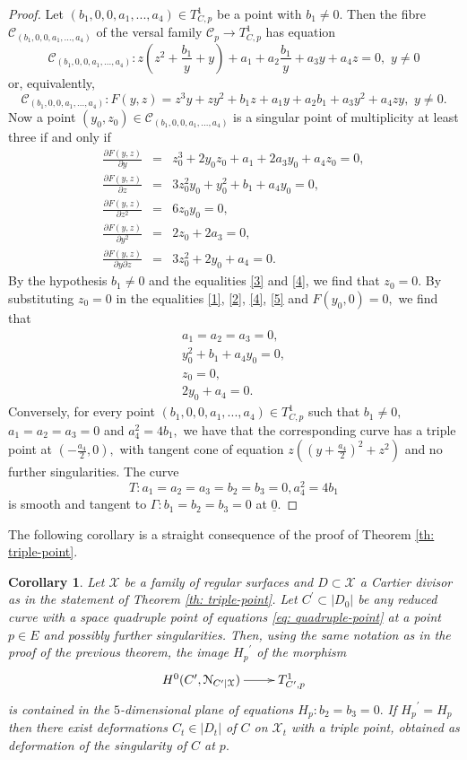 \documentclass[plain]{amsart}
\newtheorem{corollary}[theorem]{\textbf{Corollary}}
\begin{document}
\begin{proof}
Let $(b_1,0,0,a_1,...,a_4)\in T^1_{C,p}$ be a point with $b_1\neq 0.$ Then the fibre $\mathcal C_{(b_1,0,0,a_1,...,a_4)}$
of the versal family $\mathcal C_p\to T^1_{C,p}$ has equation
$$
\mathcal C_{(b_1,0,0,a_1,...,a_4)}: z(z^2+\frac{b_1}{y}+y)+a_1+a_2\frac{b_1}{y}+a_3y+a_4z=0, \,\,y\neq 0
$$
or, equivalently,
$$
\mathcal C_{(b_1,0,0,a_1,...,a_4)}: F(y,z)=z^3y+zy^2+b_1z+a_1y+a_2b_1+a_3y^2+a_4zy, \,\,y\neq 0.
$$
Now a point $(y_0,z_0)\in\mathcal C_{(b_1,0,0,a_1,...,a_4)}$
is a singular point of multiplicity at least three if and only if
\begin{eqnarray}
\frac{\partial F(y,z)}{\partial y}&=& z_0^3+2y_0z_0+a_1+2a_3y_0+a_4z_0=0,\label{1}\\
\frac{\partial F(y,z)}{\partial z}&=& 3z_0^2y_0+y^2_0+b_1+a_4y_0=0,\label{2}\\
\frac{\partial F(y,z)}{\partial z^2}&=& 6z_0y_0=0,\label{3}\\
\frac{\partial F(y,z)}{\partial y^2}&=& 2z_0+2a_3=0,\label{4}\\
\frac{\partial F(y,z)}{\partial y\partial z}&=& 3z_0^2+2y_0+a_4=0.\label{5}
\end{eqnarray}
By the hypothesis $b_1\neq 0$ and the equalities \eqref{3} and \eqref{4}, we find that $z_0=0.$
By substituting $z_0=0$ in the equalities \eqref{1}, \eqref{2}, \eqref{4}, \eqref{5} and $F(y_0,0)=0,$
we find that  
\begin{eqnarray*}
a_1=a_2=a_3=0,\\
y^2_0+b_1+a_4y_0=0,\\
z_0=0,\\
2y_0+a_4=0.
\end{eqnarray*}
Conversely, for every point $(b_1,0,0,a_1,...,a_4)\in T^1_{C,p}$ such that $b_1\neq 0,$
$a_1=a_2=a_3=0$ and $a_4^2=4b_1,$ we have that the corresponding curve has 
a triple point at $(-\frac{a_4}{2},0),$ with tangent cone of equation 
$z((y+\frac{a_4}{2})^2+z^2)$ and no further singularities. The curve  
$$
T: a_1=a_2=a_3=b_2=b_3=0, a_4^2=4b_1
$$
is smooth and tangent to  $\Gamma: b_1=b_2=b_3=0$ at $\underline 0.$
\end{proof}
The following corollary is a straight consequence of the proof of Theorem \ref{th: triple-point}.

\begin{corollary}\label{ingenerale}
Let $\mathcal X$  be a family of regular surfaces and $D\subset \mathcal X$ a Cartier divisor
as in the statement of Theorem \ref{th: triple-point}. 
Let $ C^\prime\subset |D_0|$ be any reduced curve with a space quadruple 
point of equations \eqref{eq: quadruple-point} at a
point $p\in E$ and possibly further singularities. Then, using the same notation as in the proof
of the previous theorem, the image ${H_p}^\prime$ of the morphism
\begin{equation*}
\xymatrix{
H^0(C^\prime,\mathcal N_{C^\prime|\mathcal X})\ar[r]&T^1_{C^\prime,p}}
\end{equation*}
is contained in the $5$-dimensional plane of equations $H_p:b_2=b_3=0.$ If ${H_p}^\prime=H_p$
then there exist deformations $C_t\in |D_t|$ of $C$ on $\mathcal X_t$ with a triple point, obtained 
as deformation of the singularity of $C$ at $p.$ 
\end{corollary}
\end{document}

